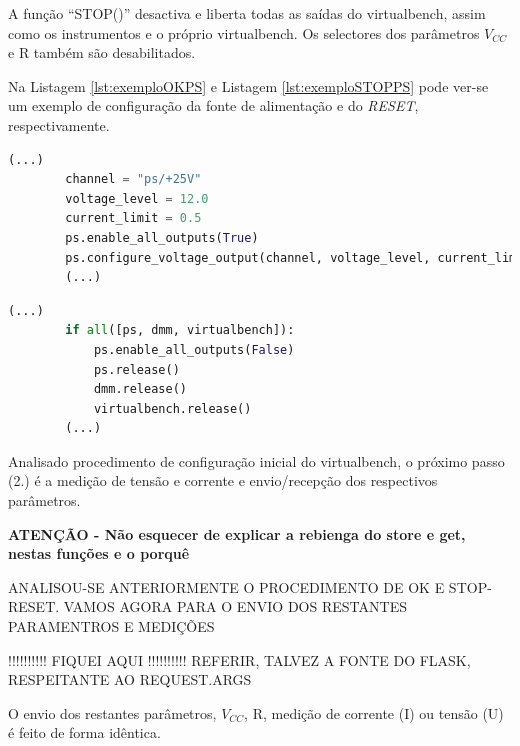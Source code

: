
A função ``STOP()'' desactiva e liberta todas as saídas do \acrshort{virtualbench}, assim como os instrumentos e o próprio \acrshort{virtualbench}. Os selectores dos parâmetros $V_{CC}$ e R também são desabilitados.

Na Listagem \ref{lst:exemploOKPS} e Listagem \ref{lst:exemploSTOPPS} pode ver-se um exemplo de configuração da fonte de alimentação e do \textit{RESET}, respectivamente. 

\begin{minipage}{0.9\linewidth}
	\begin{lstlisting}[language=python, escapechar=|, caption=Exemplo de configuração: fonte de alimentação - OK, label=lst:exemploOKPS]
		(...)
		channel = "ps/+25V"
		voltage_level = 12.0
		current_limit = 0.5 
		ps.enable_all_outputs(True)
		ps.configure_voltage_output(channel, voltage_level, current_limit)
		(...)
	\end{lstlisting}
\end{minipage}

\begin{minipage}{0.9\linewidth}
	\begin{lstlisting}[language=python, escapechar=|, caption=Exemplo de configuração: fonte de alimentação - STOP, label=lst:exemploSTOPPS]
		(...)
		if all([ps, dmm, virtualbench]):
		   	ps.enable_all_outputs(False)
        	ps.release()
        	dmm.release()
        	virtualbench.release()
		(...)
	\end{lstlisting}
\end{minipage}

Analisado procedimento de configuração inicial do \acrshort{virtualbench}, o próximo passo (2.) é a medição de tensão e corrente e envio/recepção dos respectivos parâmetros.

\textbf{ATENÇÃO - Não esquecer de explicar a rebienga do store e get, nestas funções e o porquê}

\vspace{1cm}

ANALISOU-SE ANTERIORMENTE O PROCEDIMENTO DE OK E STOP-RESET. VAMOS AGORA PARA O ENVIO DOS RESTANTES PARAMENTROS E MEDIÇÕES

!!!!!!!!!! FIQUEI AQUI !!!!!!!!!!
REFERIR, TALVEZ A FONTE DO FLASK, RESPEITANTE AO REQUEST.ARGS

O envio dos restantes parâmetros, $V_{CC}$, R, medição de corrente (I) ou tensão (U) é feito de forma idêntica.

